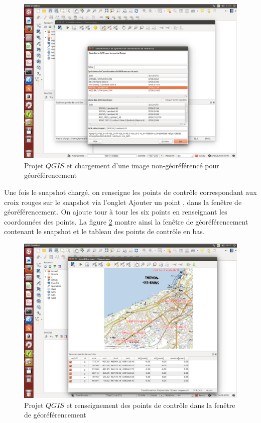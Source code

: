 \documentclass{book}
\begin{document}
\begin{figure}[H]
\begin{center}
\includegraphics[scale=0.3]{images/georeferencing/qgis-georef.png}
\end{center}
\caption{Projet $QGIS$ et chargement d'une image non-géoréférencé pour géoréférencement}
\label{qgis-georef}
\end{figure}

\clearpage

Une fois le snapshot chargé, on renseigne les points de contr\^{o}le correspondant aux croix rouges sur le snapshot via l'onglet 
\og Ajouter un point \fg{}, dans la fenêtre de géoréférencement. On ajoute tour à tour les six points en renseignant
les coordonnées des points. La figure \ref{qgis-points} montre ainsi la fen\^{e}tre de géoréférencement contenant le snapshot 
et le tableau des points de contr\^{o}le en bas.

\begin{figure}[H]
\begin{center}
\includegraphics[scale=0.3]{images/georeferencing/qgis-points.png}
\end{center}
\caption{Projet $QGIS$ et renseignement des points de contr\^{o}le dans la fen\^{e}tre de géoréférencement}
\label{qgis-points}
\end{figure}
\end{document}
